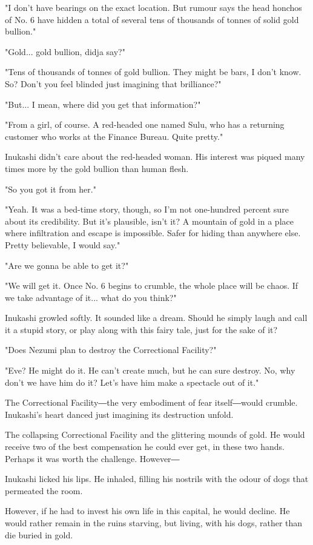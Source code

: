 "I don't have bearings on the exact location. But rumour says the head
honchos of No. 6 have hidden a total of several tens of thousands of
tonnes of solid gold bullion."

"Gold... gold bullion, didja say?"

"Tens of thousands of tonnes of gold bullion. They might be bars, I
don't know. So? Don't you feel blinded just imagining that brilliance?"

"But... I mean, where did you get that information?"

"From a girl, of course. A red-headed one named Sulu, who has a
returning customer who works at the Finance Bureau. Quite pretty."

Inukashi didn't care about the red-headed woman. His interest was piqued
many times more by the gold bullion than human flesh.

"So you got it from her."

"Yeah. It was a bed-time story, though, so I'm not one-hundred percent
sure about its credibility. But it's plausible, isn't it? A mountain of
gold in a place where infiltration and escape is impossible. Safer for
hiding than anywhere else. Pretty believable, I would say."

"Are we gonna be able to get it?"

"We will get it. Once No. 6 begins to crumble, the whole place will be
chaos. If we take advantage of it... what do you think?"

Inukashi growled softly. It sounded like a dream. Should he simply laugh
and call it a stupid story, or play along with this fairy tale, just for
the sake of it?

"Does Nezumi plan to destroy the Correctional Facility?"

"Eve? He might do it. He can't create much, but he can sure destroy. No,
why don't we have him do it? Let's have him make a spectacle out of it."

The Correctional Facility―the very embodiment of fear itself―would
crumble. Inukashi's heart danced just imagining its destruction unfold.

The collapsing Correctional Facility and the glittering mounds of gold.
He would receive two of the best compensation he could ever get, in
these two hands. Perhaps it was worth the challenge. However―

Inukashi licked his lips. He inhaled, filling his nostrils with the
odour of dogs that permeated the room.

However, if he had to invest his own life in this capital, he would
decline. He would rather remain in the ruins starving, but living, with
his dogs, rather than die buried in gold.

